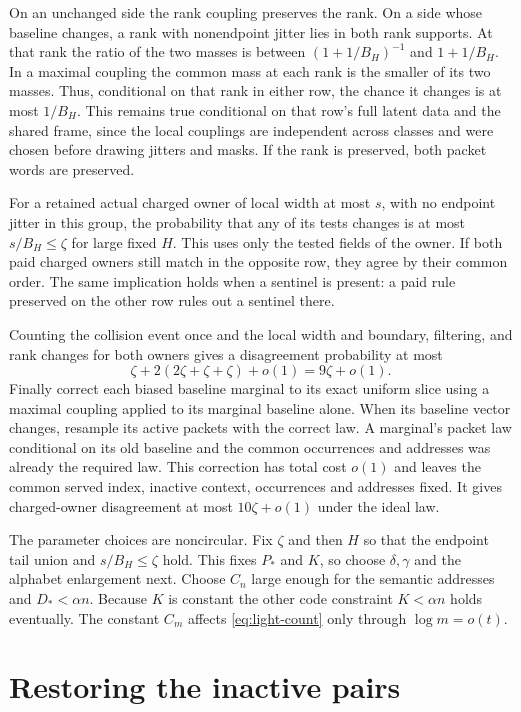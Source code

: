 \documentclass[11pt]{article}
\begin{document}
On an unchanged side the rank coupling preserves the rank. On a
side whose baseline changes, a rank with nonendpoint jitter lies
in both rank supports. At that rank the ratio of the two masses
is between $(1+1/B_H)^{-1}$ and $1+1/B_H$. In a maximal coupling
the common mass at each rank is the smaller of its two masses.
Thus, conditional on that rank in either row, the chance it
changes is at most $1/B_H$. This remains true conditional on
that row's full latent data and the shared frame, since the local
couplings are independent across classes and were chosen before
drawing jitters and masks. If the rank is preserved, both packet
words are preserved.

For a retained actual charged owner of local width at most $s$, with
no endpoint jitter in this group, the probability that any of its
tests changes is at most $s/B_H\le\zeta$ for large fixed $H$. This
uses only the tested fields of the owner. If both paid charged
owners still match in the opposite row, they agree by their common
order. The same implication holds when a sentinel is present:
a paid rule preserved on the other row rules out a sentinel there.

Counting the collision event once and the local width and boundary,
filtering, and rank changes for both owners gives a disagreement
probability at most
\[
  \zeta+2(2\zeta+\zeta+\zeta)+o(1)=9\zeta+o(1).
\]
Finally correct each biased baseline marginal to its exact uniform
slice using a maximal coupling applied to its marginal baseline alone.
When its baseline vector changes,
resample its active packets with the correct law. A marginal's
packet law conditional on its old baseline and the common
occurrences and addresses was already the required law. This
correction has total cost $o(1)$ and leaves the common served index,
inactive context, occurrences and addresses fixed. It gives
charged-owner disagreement at most $10\zeta+o(1)$ under the ideal
law.

The parameter choices are noncircular. Fix $\zeta$ and then $H$ so
that the endpoint tail union and $s/B_H\le\zeta$ hold. This fixes
$P_*$ and $K$, so choose $\delta,\gamma$ and the alphabet enlargement
next. Choose $C_n$ large enough for the semantic addresses and
$D_*<\alpha n$. Because $K$ is constant the other code constraint
$K<\alpha n$ holds eventually. The constant $C_m$ affects
\eqref{eq:light-count} only through $\log m=o(t)$.

\section{Restoring the inactive pairs}\label{sec:restoration}
\end{document}
